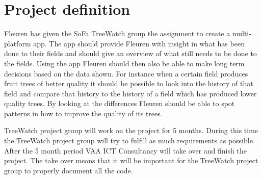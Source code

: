 \section {Project definition}
Fleuren has given the SoFa TreeWatch group the assignment to create a multi-platform app. The app should provide Fleuren with insight in what has been done to their fields and should give an overview of what still needs to be done to the fields. Using the app Fleuren should then also be able to make long term decisions based on the data shown. For instance when a certain field produces fruit trees of better quality it should be possible to look into the history of that field and compare that history to the history of a field which has produced lower quality trees. By looking at the differences Fleuren should be able to spot patterns in how to improve the quality of its trees.

TreeWatch project group will work on the project for 5 months. During this time the TreeWatch project group will try to fulfill as much requirements as possible. After the 5 month period VAA ICT Consultancy will take over and finish the project. The take over means that it will be important for the TreeWatch project group to properly document all the code.



